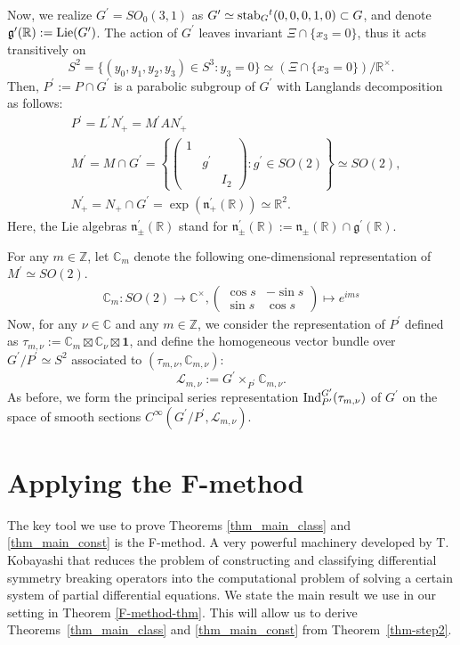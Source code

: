 \documentclass[12pt, pdflatex, a4paper]{article}
\theoremstyle{plain}
\theoremstyle{definition}
\def\C{{\mathbb C}}
\def\g{\mathfrak{g}}
\def\Ind{\text{\normalfont{Ind}}}
\def\Lie{\text{\normalfont{Lie}}}
\def\L{\mathcal{L}}
\def\n{\mathfrak{n}}
\def\R{{\mathbb R}}
\def\stab{\text{\normalfont{stab}}}
\def\Z{{\mathbb Z}}
\begin{document}
Now, we realize $G^\prime = SO_0(3,1)$ as $G^\prime \simeq \stab_G{}^t(0,0,0,1,0) \subset G$, and denote $\g^\prime(\R) := \Lie(G^\prime)$. The action of $G^\prime$ leaves invariant $\Xi\cap\{x_3 = 0\}$, thus it acts transitively on
\begin{equation*}
S^2 = \{(y_0, y_1, y_2, y_3) \in S^3 : y_3 = 0\} \simeq \left(\Xi\cap\{x_3 = 0\}\right)/\R^\times.
\end{equation*}
Then, $P^\prime := P \cap G^\prime$ is a parabolic subgroup of $G^\prime$ with Langlands decomposition as follows:
\begin{align*}
& P^\prime = L^\prime N_+^\prime = M^\prime A N_+^\prime\\
& M^\prime = M\cap G^\prime =\left\{
\begin{pmatrix}
1 & &\\
& g^\prime &\\
& & I_2
\end{pmatrix} : g^\prime \in SO(2) \right\} \simeq SO(2),\\
&N^\prime_+ =  N_+ \cap G^\prime = \exp(\n_+^\prime(\R)) \simeq \R^2.
\end{align*}
Here, the Lie algebras $\n_\pm^\prime(\R)$ stand for $\n_\pm^\prime(\R) := \n_\pm(\R)\cap \g^\prime(\R)$.

For any $m \in \Z$, let $\C_m$ denote the following one-dimensional representation of $M^\prime \simeq SO(2)$.
\begin{align*}
\C_m: SO(2) \longrightarrow \C^\times, 
\begin{pmatrix}
\cos s & -\sin s\\
\sin s & \cos s
\end{pmatrix} \mapsto e^{ims}
\end{align*}
Now, for any $\nu \in \C$ and any $m \in \Z$, we consider the representation of $P^\prime$ defined as $\tau_{m, \nu} := \C_m \boxtimes \C_\nu \boxtimes \mathbf{1}$, and define the homogeneous vector bundle over $G^\prime/P^\prime\simeq S^2$ associated to $(\tau_{m,\nu}, \C_{m,\nu}):$
\begin{equation}\label{vectorbundle-L}
\L_{m,\nu} := G^\prime \times_{P^\prime} \C_{m,\nu}.
\end{equation}
As before, we form the principal series representation $\Ind_{P^\prime}^{G^\prime}(\tau_{m,\nu})$ of $G^\prime$ on the space of smooth sections $C^\infty(G^\prime/P^\prime, \L_{m,\nu})$.


\section{Applying the F-method}\label{section-applyingFmethod}
The key tool we use to prove Theorems \ref{thm_main_class} and \ref{thm_main_const} is the F-method. A very powerful machinery developed by T. Kobayashi that reduces the problem of constructing and classifying differential symmetry breaking operators into the computational problem of solving a certain system of partial differential equations. We state the main result we use in our setting in Theorem \ref{F-method-thm}. This will allow us to derive Theorems~\ref{thm_main_class} and \ref{thm_main_const} from Theorem~\ref{thm-step2}.
\end{document}
